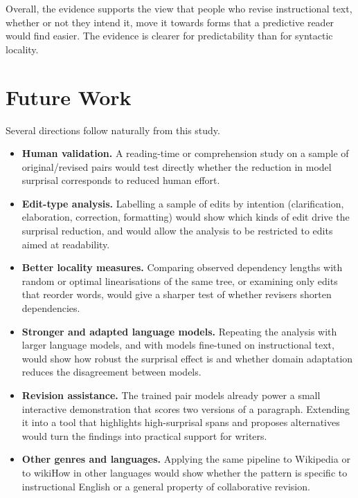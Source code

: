 \documentclass[12pt,a4paper,oneside]{report}
\begin{document}
Overall, the evidence supports the view that people who revise instructional text, whether or not they intend it, move it towards forms that a predictive reader would find easier. The evidence is clearer for predictability than for syntactic locality.

\section{Future Work}
Several directions follow naturally from this study.
\begin{itemize}
  \item \textbf{Human validation.} A reading-time or comprehension study on a sample of original/revised pairs would test directly whether the reduction in model surprisal corresponds to reduced human effort.
  \item \textbf{Edit-type analysis.} Labelling a sample of edits by intention (clarification, elaboration, correction, formatting) would show which kinds of edit drive the surprisal reduction, and would allow the analysis to be restricted to edits aimed at readability.
  \item \textbf{Better locality measures.} Comparing observed dependency lengths with random or optimal linearisations of the same tree, or examining only edits that reorder words, would give a sharper test of whether revisers shorten dependencies.
  \item \textbf{Stronger and adapted language models.} Repeating the analysis with larger language models, and with models fine-tuned on instructional text, would show how robust the surprisal effect is and whether domain adaptation reduces the disagreement between models.
  \item \textbf{Revision assistance.} The trained pair models already power a small interactive demonstration that scores two versions of a paragraph. Extending it into a tool that highlights high-surprisal spans and proposes alternatives would turn the findings into practical support for writers.
  \item \textbf{Other genres and languages.} Applying the same pipeline to Wikipedia or to wikiHow in other languages would show whether the pattern is specific to instructional English or a general property of collaborative revision.
\end{itemize}
\end{document}

